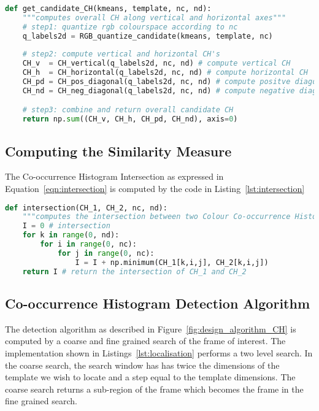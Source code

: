\begin{lstlisting}[language=Python, caption={Computing candidate CH}, captionpos=b, label={lst:chcand}]
def get_candidate_CH(kmeans, template, nc, nd):
    """computes overall CH along vertical and horizontal axes"""
    # step1: quantize rgb colourspace according to nc
    q_labels2d = RGB_quantize_candidate(kmeans, template, nc)
    
    # step2: compute vertical and horizontal CH's
    CH_v  = CH_vertical(q_labels2d, nc, nd) # compute vertical CH
    CH_h  = CH_horizontal(q_labels2d, nc, nd) # compute horizontal CH
    CH_pd = CH_pos_diagonal(q_labels2d, nc, nd) # compute positve diagonal CH
    CH_nd = CH_neg_diagonal(q_labels2d, nc, nd) # compute negative diagonal CH

    # step3: combine and return overall candidate CH
    return np.sum((CH_v, CH_h, CH_pd, CH_nd), axis=0)
\end{lstlisting}

\subsection{Computing the Similarity Measure}
The Co-occurrence Histogram Intersection as expressed in
Equation~\ref{eqn:intersection} is computed by the code in Listing~\ref{lst:intersection}

\begin{lstlisting}[language=Python, caption={Computing candidate CH}, captionpos=b, label={lst:intersection}]
def intersection(CH_1, CH_2, nc, nd):
    """computes the intersection between two Colour Co-occurrence Histograms""" 
    I = 0 # intersection
    for k in range(0, nd):
        for i in range(0, nc):
            for j in range(0, nc):
                I = I + np.minimum(CH_1[k,i,j], CH_2[k,i,j])
    return I # return the intersection of CH_1 and CH_2
\end{lstlisting}

\subsection{Co-occurrence Histogram Detection Algorithm}
The detection algorithm as described in Figure~\ref{fig:design_algorithm_CH}
is computed by a coarse and fine grained search of the frame of interest. 
The implementation shown in Listings~\ref{lst:localisation} performs a two level
search. In the coarse search, the search window has has twice the dimensions of the
template we wish to locate and a step equal to the template dimensions. The
coarse search returns a sub-region of the frame which becomes the frame in the
fine grained search. 

